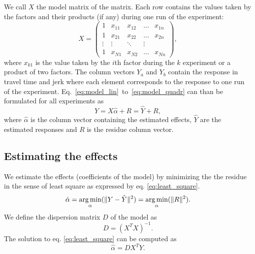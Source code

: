 We call $X$ the model matrix of the matrix. Each row contains the values taken by the factors and their products (if any) during one run of the experiment:
\begin{equation}
	X = \begin{pmatrix}
	1 & x_{11} & x_{12} & \dots & x_{1n} \\
	1 & x_{21} & x_{22} & \dots & x_{2n} \\
	\vdots & \vdots & \ddots & \vdots \\
	1 & x_{N1} & x_{N2} & \dots & x_{Nn}
	\end{pmatrix},
\end{equation}
where $x_{k1}$ is the value taken by the $i$th factor during the $k$ experiment or a product of two factors. The column vectors $Y_a$ and $Y_b$ contain the response in travel time and jerk where each element corresponds to the response to one run of the experiment.
Eq.~\ref{eq:model_lin}~to~\ref{eq:model_quadr} can than be formulated for all experiments as
\begin{equation}
 Y = X \hat{\alpha} + R = \hat{Y} + R,
\end{equation}
where $\hat{\alpha}$ is the column vector containing the estimated effects, $\hat{Y}$ are the estimated responses and $R$ is the residue column vector.
\subsection{Estimating the effects}
We estimate the effects (coefficients of the model) by minimizing the the residue in the sense of least square as expressed by eq. \ref{eq:least_square}.
\begin{equation}\label{eq:least_square}
	\hat\alpha =  \operatorname*{arg\,min}_{\alpha}(\|Y - \hat{Y}\|^2) = \operatorname*{arg\,min}_{\alpha}(\|R\|^2).
\end{equation}
We define the dispersion matrix $D$ of the model as
\begin{equation}
	D = (X^T X)^{-1}.
\end{equation}
The solution to eq. \ref{eq:least_square} can be computed as
\begin{equation}
	\hat\alpha = D X^{T} Y.
\end{equation}


